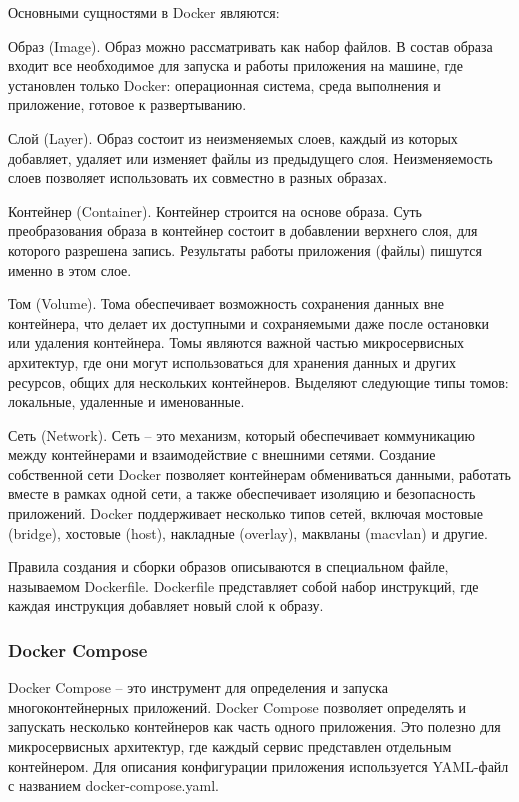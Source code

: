 Основными сущностями в Docker являются:
\begin{enumerate_num}
    \item Образ (Image).
    Образ можно рассматривать как набор файлов.
    В состав образа входит все необходимое для запуска и работы приложения на машине, где установлен только Docker: операционная система, среда выполнения и приложение, готовое к развертыванию.
    \item Слой (Layer).
    Образ состоит из неизменяемых слоев, каждый из которых добавляет, удаляет или изменяет файлы из предыдущего слоя.
    Неизменяемость слоев позволяет использовать их совместно в разных образах.
    \item Контейнер (Container).
    Контейнер строится на основе образа.
    Суть преобразования образа в контейнер состоит в добавлении верхнего слоя, для которого разрешена запись.
    Результаты работы приложения (файлы) пишутся именно в этом слое.
    \item Том (Volume).
    Тома обеспечивает возможность сохранения данных вне контейнера, что делает их доступными и сохраняемыми даже после остановки или удаления контейнера.
    Томы являются важной частью микросервисных архитектур, где они могут использоваться для хранения данных и других ресурсов, общих для нескольких контейнеров.
    Выделяют следующие типы томов: локальные, удаленные и именованные.
    \item Сеть (Network).
    Сеть -- это механизм, который обеспечивает коммуникацию между контейнерами и взаимодействие с внешними сетями.
    Создание собственной сети Docker позволяет контейнерам обмениваться данными, работать вместе в рамках одной сети, а также обеспечивает изоляцию и безопасность приложений.
    Docker поддерживает несколько типов сетей, включая мостовые (bridge), хостовые (host), накладные (overlay), маквланы (macvlan) и другие.
\end{enumerate_num}

Правила создания и сборки образов описываются в специальном файле, называемом Dockerfile.
Dockerfile представляет собой набор инструкций, где каждая инструкция добавляет новый слой к образу.

\subsubsection{Docker Compose}\label{subsubsec:domain:docker-compose}
Docker Compose -- это инструмент для определения и запуска многоконтейнерных приложений.
Docker Compose позволяет определять и запускать несколько контейнеров как часть одного приложения.
Это полезно для микросервисных архитектур, где каждый сервис представлен отдельным контейнером.
Для описания конфигурации приложения используется YAML-файл с названием docker-compose.yaml.

